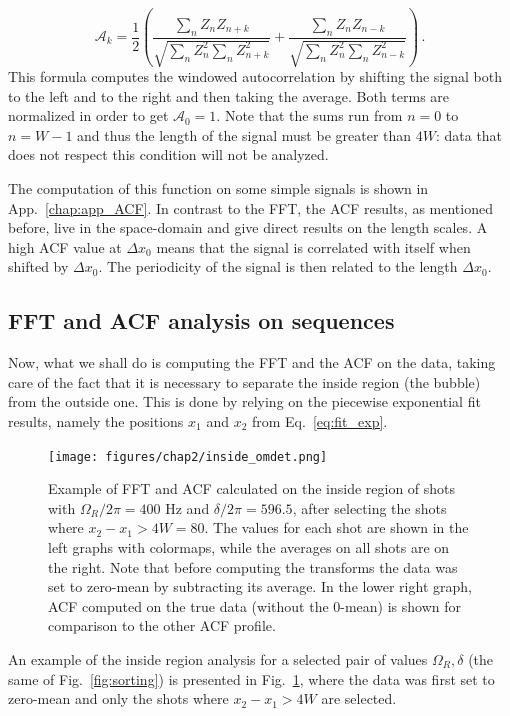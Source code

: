 \begin{equation*}
    \mathcal{A}_k = \frac{1}{2} \left( \frac{\sum_{n} Z_n Z_{n+k}}{\sqrt{\sum_{n} Z_n^2 \sum_{n} Z_{n+k}^2}} + \frac{\sum_{n} Z_n Z_{n-k}}{\sqrt{\sum_{n} Z_n^2 \sum_{n} Z_{n-k}^2}} \right)\, .
\end{equation*}
This formula computes the windowed autocorrelation by shifting the signal both to the left and to the right and then taking the average.
Both terms are normalized in order to get $\mathcal{A}_0 = 1$. 
Note that the sums run from $n = 0$ to $n = W-1$ and thus the length of the signal must be greater than $4W$: data that does not respect this condition will not be analyzed.

The computation of this function on some simple signals is shown in App.\ \ref{chap:app_ACF}. In contrast to the FFT, the ACF results, as mentioned before, live in the space-domain and give direct results on the length scales. A high ACF value at $\Delta x_0$ means that the signal is correlated with itself when shifted by $\Delta x_0$. The periodicity of the signal is then related to the length $\Delta x_0$.

\subsection{FFT and ACF analysis on sequences}
Now, what we shall do is computing the FFT and the ACF on the data, taking care of the fact that it is necessary to separate the inside region (the bubble) from the outside one. This is done by relying on the piecewise exponential fit results, namely the positions $x_1$ and $x_2$ from Eq.\ \eqref{eq:fit_exp}.
\begin{figure}[h!]
    \centering
    \texttt{[image: figures/chap2/inside\_omdet.png]}
    \caption{Example of FFT and ACF calculated on the inside region of shots with $\Omega_R/2\pi = 400$ \unit{\hertz} and $\delta/2\pi = 596.5$, after selecting the shots where $x_2-x_1 > 4W = 80$. The values for each shot are shown in the left graphs with colormaps, while the averages on all shots are on the right. Note that before computing the transforms the data was set to zero-mean by subtracting its average. In the lower right graph, ACF computed on the true data (without the 0-mean) is shown for comparison to the other ACF profile.}
    \label{fig:inside_00}
\end{figure}
An example of the inside region analysis for a selected pair of values $\Omega_R, \delta$ (the same of Fig.\ \ref{fig:sorting}) is presented in Fig.\ \ref{fig:inside_00}, where the data was first set to zero-mean and only the shots where $x_2-x_1 > 4W$ are selected.

